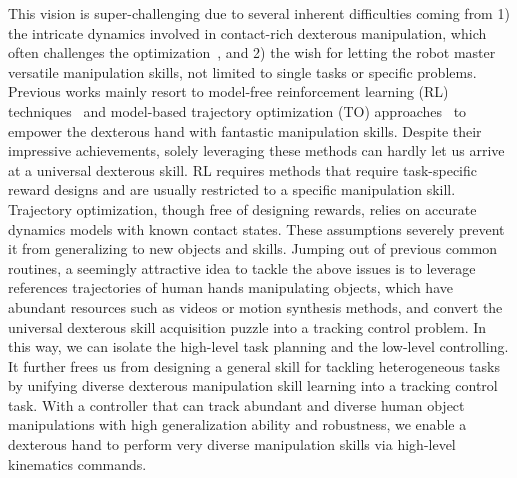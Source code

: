 This vision is super-challenging due to several inherent difficulties coming from 1) the intricate dynamics involved in contact-rich dexterous manipulation, which often challenges the optimization~\citep{pang2021convex,pang2023global,liu2024quasisim,Jin2024ComplementarityFreeMM}, and 2) the wish for letting the robot master versatile manipulation skills, not limited to single tasks or specific problems. Previous works mainly resort to model-free reinforcement learning (RL) techniques~\citep{chen2023visual,chen2021system,akkaya2019solving,christen2022d,zhang2023artigrasp,qin2022dexmv,liu2022herd,wu2023learning,gupta2016learning,wang2023physhoi} and model-based trajectory optimization (TO) approaches~\citep{pang2021convex,pang2023global,Jin2024ComplementarityFreeMM,hwangbo2018per} to empower the dexterous hand with fantastic manipulation skills. Despite their impressive achievements, solely leveraging these methods can hardly let us arrive at a universal dexterous skill. RL requires methods that require task-specific reward designs and are usually restricted to a specific manipulation skill. Trajectory optimization, though free of designing rewards, relies on accurate dynamics models with known contact states. These assumptions severely prevent it from generalizing to new objects and skills. Jumping out of previous common routines, a seemingly attractive idea to tackle the above issues is to leverage references trajectories of human hands manipulating objects, which have abundant resources such as videos or motion synthesis methods, and convert the universal dexterous skill acquisition puzzle into a tracking control problem. In this way, we can isolate the high-level task planning and the low-level controlling. It further frees us from designing a general skill for tackling heterogeneous tasks by unifying diverse dexterous manipulation skill learning into a tracking control task.
With a controller that can track abundant and diverse human object manipulations with high generalization ability and robustness, we enable a dexterous hand to perform very diverse manipulation skills via high-level kinematics commands.
